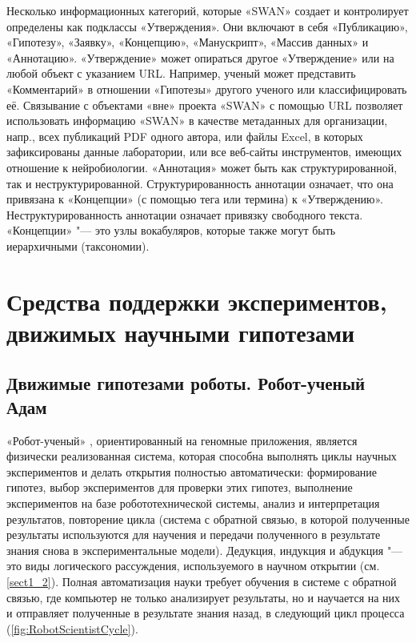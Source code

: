 Несколько информационных категорий, которые «SWAN» создает и контролирует определены как подклассы «Утверждения». 
Они включают в себя «Публикацию», «Гипотезу», «Заявку», «Концепцию», «Манускрипт», «Массив данных» и «Аннотацию». 
«Утверждение» может опираться другое «Утверждение» или на любой объект с указанием URL. Например, ученый может 
представить «Комментарий» в отношении «Гипотезы» другого ученого или классифицировать её. Связывание с объектами 
«вне» проекта «SWAN» с помощью URL позволяет использовать информацию «SWAN» в качестве метаданных для организации, 
напр., всех публикаций PDF одного автора, или файлы Excel, в которых зафиксированы данные лаборатории, или все 
веб-сайты инструментов, имеющих отношение к нейробиологии. «Аннотация» может быть как структурированной, так и 
неструктурированной. Структурированность аннотации означает, что она привязана к «Концепции» (с помощью тега или 
термина) к «Утверждению». Неструктурированность аннотации означает привязку свободного текста. 
«Концепции» "--- это узлы вокабуляров, которые также могут быть иерархичными (таксономии).

\section{Средства поддержки экспериментов, движимых научными гипотезами}\label{sect1_3}

\subsection{Движимые гипотезами роботы. Робот-ученый Адам}\label{sect1_3_2}
«Робот-ученый» \cite{king2009automation, sparkes2010towards}, ориентированный на геномные приложения, 
является физически реализованная система, которая способна выполнять циклы научных экспериментов и делать 
открытия полностью автоматически: формирование гипотез, выбор экспериментов для проверки этих гипотез, выполнение 
экспериментов на базе робототехнической системы, анализ и интерпретация результатов, повторение цикла (система с 
обратной связью, в которой полученные результаты используются для научения и передачи полученного в результате знания 
снова в экспериментальные модели). Дедукция, индукция и абдукция "--- это виды логического рассуждения, используемого 
в научном открытии (см. \cref{sect1_2}). Полная автоматизация науки требует обучения в системе с обратной связью, где 
компьютер не только анализирует результаты, но и научается на них и отправляет полученные в результате знания назад, 
в следующий цикл процесса (\cref{fig:RobotScientistCycle}).

